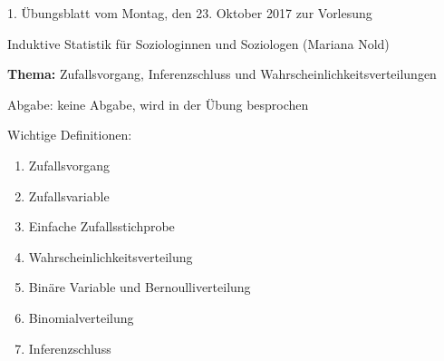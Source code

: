 \documentclass[11pt]{article}
\newcommand{\VORLESUNG}{Induktive Statistik für Soziologinnen und Soziologen}
\newcommand{\STAFF}{Mariana Nold}
\newcommand{\ASSIGNMENT}{1}
\newcommand{\HANDOUT}{Montag, den 23. Oktober   2017}
\newcommand{\DELIVER}{keine Abgabe, wird in der Übung besprochen}
\newcommand{\PRACTICAL}[1]{\marginpar{\tiny {\bf Aufgabe \\ abgeben!} #1}}
\newcommand{\titel}{Zufallsvorgang, Inferenzschluss und Wahrscheinlichkeitsverteilungen}
\begin{document}

\begin{center}
\ASSIGNMENT{}. Übungsblatt vom \HANDOUT{} zur Vorlesung 
\vspace*{0.5cm}

{\Large \VORLESUNG{}}
(\STAFF{}) 


\vspace*{0.5cm}
{\textbf{Thema:} \titel{}\\}
\vspace*{0.2cm}

{\small Abgabe: \DELIVER{}}
\vspace*{1cm}
\end{center}

Wichtige Definitionen:
\begin{enumerate}
\item{Zufallsvorgang}
\item{Zufallsvariable}
\item{Einfache Zufallsstichprobe}
\item{Wahrscheinlichkeitsverteilung}
\item{Binäre Variable und  Bernoulliverteilung}
\item{Binomialverteilung}
\item{Inferenzschluss}
\end{enumerate}
\vspace{2cm}
\end{document}
